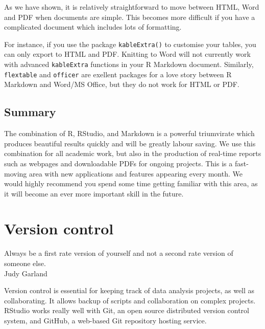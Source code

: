 \documentclass[
  12pt,
  krantz2]{krantz}
\renewenvironment{quote}{\begin{VF}}{\end{VF}}
\begin{document}
As we have shown, it is relatively straightforward to move between HTML, Word and PDF when documents are simple.
This becomes more difficult if you have a complicated document which includes lots of formatting.

For instance, if you use the package \texttt{kableExtra()} to customise your tables, you can only export to HTML and PDF.
Knitting to Word will not currently work with advanced \texttt{kableExtra} functions in your R Markdown document.
Similarly, \texttt{flextable} and \texttt{officer} are exellent packages for a love story between R Markdown and Word/MS Office, but they do not work for HTML or PDF.

\hypertarget{summary-4}{%
\section{Summary}\label{summary-4}}

The combination of R, RStudio, and Markdown is a powerful triumvirate which produces beautiful results quickly and will be greatly labour saving.
We use this combination for all academic work, but also in the production of real-time reports such as webpages and downloadable PDFs for ongoing projects.
This is a fast-moving area with new applications and features appearing every month.
We would highly recommend you spend some time getting familiar with this area, as it will become an ever more important skill in the future.

\hypertarget{chap14-h1}{%
\chapter{Version control}\label{chap14-h1}}


\begin{quote}
Always be a first rate version of yourself and not a second rate version of someone else.\\
Judy Garland
\end{quote}

Version control is essential for keeping track of data analysis projects, as well as collaborating.
It allows backup of scripts and collaboration on complex projects.
RStudio works really well with Git, an open source distributed version control system, and GitHub, a web-based Git repository hosting service.

\end{document}
